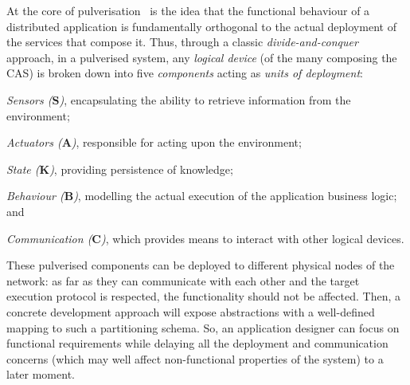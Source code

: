 \def\nm{0.35cm} %
\def\tpscale{0.8}
\newcommand{\agent}{node}
\renewcommand{\boldsymbol}[1]{\mathbf{#1}}
\newcommand{\LSens}{\boldsymbol{S}}
\newcommand{\LComp}{\boldsymbol{B}}
\newcommand{\LComm}{\boldsymbol{C}}
\newcommand{\LAct}{\boldsymbol{A}}
\newcommand{\LState}{\boldsymbol{K}}

At the core of pulverisation~\cite{DBLP:journals/fi/CasadeiPPVW20} is the idea that the functional behaviour of a distributed application is fundamentally orthogonal to the actual deployment of the services that compose it.
%
Thus, through a classic \emph{divide-and-conquer} approach, in a pulverised system, any \emph{logical device} (of the many composing the CAS) is broken down into five \emph{components} acting as \emph{units of deployment}:
\begin{enumerate*}
 \item \emph{Sensors ($\LSens$)}, encapsulating the ability to retrieve information from the environment;
 \item \emph{Actuators ($\LAct$)}, responsible for acting upon the environment;
 \item \emph{State ($\LState$)}, providing persistence of knowledge;
 \item \emph{Behaviour ($\LComp$)}, modelling the actual execution of the application business logic; and
 \item \emph{Communication ($\LComm$)}, which provides means to interact with other logical devices.
\end{enumerate*}
%
These pulverised components can be deployed to different physical nodes of the network:
 as far as they can communicate with each other
 and the target execution protocol is respected,
 the functionality should not be affected.
%
Then, 
 a concrete development approach
 will expose abstractions
 with a well-defined mapping
 to such a partitioning schema.
%
So, an application designer can focus on functional requirements 
 while delaying all the deployment and communication concerns 
 (which may well affect non-functional properties of the system) 
 to a later moment. 

